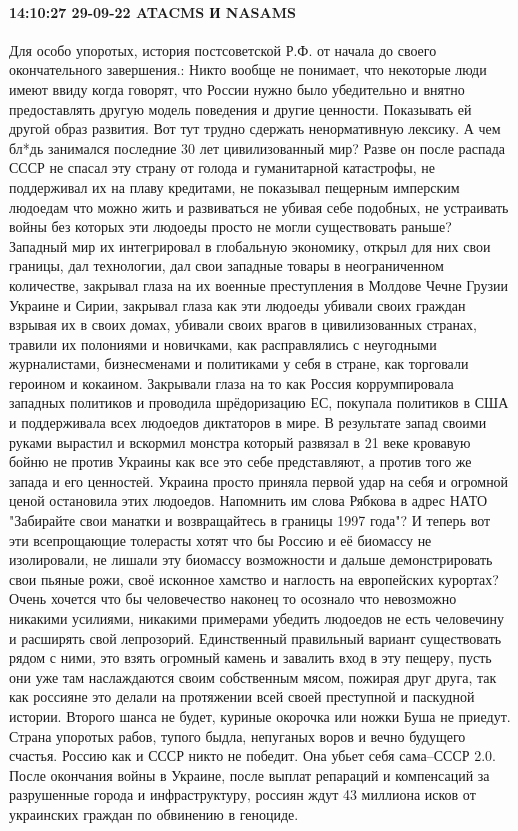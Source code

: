 \paragraph{14:10:27 29-09-22 ATACMS И NASAMS}

Для особо упоротых, история постсоветской Р.Ф. от начала до своего
окончательного завершения.: Никто вообще не понимает, что некоторые люди имеют
ввиду когда говорят, что России нужно было убедительно и внятно предоставлять
другую модель поведения и другие ценности. Показывать ей другой образ развития.
Вот тут трудно сдержать ненормативную лексику. А чем бл*дь занимался последние
30 лет цивилизованный мир? Разве он после распада СССР не спасал эту страну от
голода и гуманитарной катастрофы, не поддерживал их на плаву кредитами, не
показывал пещерным имперским людоедам что можно жить и развиваться не убивая
себе подобных, не устраивать войны без которых эти людоеды просто не могли
существовать раньше? Западный мир их интегрировал в глобальную экономику,
открыл для них свои границы, дал технологии, дал свои западные товары в
неограниченном количестве, закрывал глаза на их военные преступления в Молдове
Чечне Грузии Украине и Сирии, закрывал глаза как эти людоеды убивали своих
граждан взрывая их в своих домах, убивали своих врагов в цивилизованных
странах, травили их полониями и новичками, как расправлялись с неугодными
журналистами, бизнесменами и политиками у себя в стране, как торговали героином
и кокаином. Закрывали глаза на то как Россия коррумпировала западных политиков
и проводила шрёдоризацию ЕС, покупала политиков в США и поддерживала всех
людоедов диктаторов в мире. В результате запад своими руками вырастил и
вскормил монстра который развязал в 21 веке кровавую бойню не против Украины
как все это себе представляют, а против того же запада и его ценностей. Украина
просто приняла первой удар на себя и огромной ценой остановила этих людоедов.
Напомнить им слова Рябкова в адрес НАТО "Забирайте свои манатки и возвращайтесь
в границы 1997 года"? И теперь вот эти всепрощающие толерасты хотят что бы
Россию и её биомассу не изолировали, не лишали эту биомассу возможности и
дальше демонстрировать свои пьяные рожи, своё исконное хамство и наглость на
европейских курортах? Очень хочется что бы человечество наконец то осознало что
невозможно никакими усилиями, никакими примерами убедить людоедов не есть
человечину и расширять свой лепрозорий. Единственный правильный вариант
существовать рядом с ними, это взять огромный камень и завалить вход в эту
пещеру, пусть они уже там наслаждаются своим собственным мясом, пожирая друг
друга, так как россияне это делали на протяжении всей своей преступной и
паскудной истории. Второго шанса не будет, куриные окорочка или ножки Буша не
приедут. Страна упоротых рабов, тупого быдла, непуганых воров и вечно будущего
счастья. Россию как и СССР никто не победит. Она убьет себя сама--СССР 2.0.
После окончания войны в Украине, после выплат репараций и компенсаций за
разрушенные города и инфраструктуру, россиян ждут 43 миллиона исков от
украинских граждан по обвинению в геноциде.

